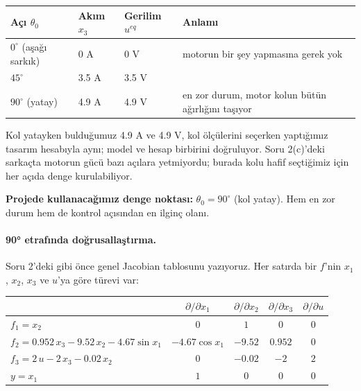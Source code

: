 \documentclass[11pt,a4paper]{article}
\begin{document}
\begin{center}
\begin{tabular}{llll}
\toprule
Açı $\theta_0$ & Akım $x_3$ & Gerilim $u^{eq}$ & Anlamı\\
\midrule
$0^\circ$ (aşağı sarkık) & 0 A & 0 V & motorun bir şey yapmasına gerek yok\\
$45^\circ$ & 3.5 A & 3.5 V & \\
$90^\circ$ (yatay) & 4.9 A & 4.9 V & en zor durum, motor kolun bütün ağırlığını taşıyor\\
\bottomrule
\end{tabular}
\end{center}

Kol yatayken bulduğumuz 4.9 A ve 4.9 V, kol ölçülerini seçerken yaptığımız tasarım hesabıyla aynı; model ve hesap birbirini doğruluyor. Soru 2(c)'deki sarkaçta motorun gücü bazı açılara yetmiyordu; burada kolu hafif seçtiğimiz için her açıda denge kurulabiliyor.

\textbf{Projede kullanacağımız denge noktası:} $\theta_0 = 90^\circ$ (kol yatay). Hem en zor durum hem de kontrol açısından en ilginç olanı.

\paragraph{90° etrafında doğrusallaştırma.} Soru 2'deki gibi önce genel Jacobian tablosunu yazıyoruz. Her satırda bir $f$'nin $x_1$, $x_2$, $x_3$ ve $u$'ya göre türevi var:

\begin{center}
\renewcommand{\arraystretch}{1.3}
\begin{tabular}{lcccc}
\toprule
 & $\partial/\partial x_1$ & $\partial/\partial x_2$ & $\partial/\partial x_3$ & $\partial/\partial u$\\
\midrule
$f_1 = x_2$ & $0$ & $1$ & $0$ & $0$\\
$f_2 = 0.952\,x_3 - 9.52\,x_2 - 4.67\sin x_1$ & $-4.67\cos x_1$ & $-9.52$ & $0.952$ & $0$\\
$f_3 = 2\,u - 2\,x_3 - 0.02\,x_2$ & $0$ & $-0.02$ & $-2$ & $2$\\
$y = x_1$ & $1$ & $0$ & $0$ & $0$\\
\bottomrule
\end{tabular}
\end{center}
\end{document}
